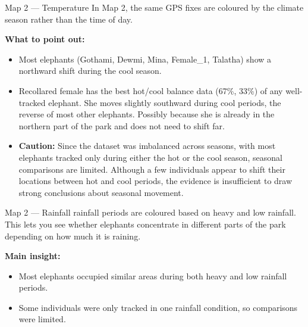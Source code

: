 \documentclass{beamer}
\begin{document}
	
	
	
	
	\begin{frame}{Map 2 --- Temperature}
		In Map 2, the same GPS fixes are coloured by the climate season rather than
		the time of day.
		
		\vspace{4pt}
		\textbf{What to point out:}
		\begin{itemize}
			\item Most elephants (Gothami, Dewmi, Mina, Female\_1, Talatha) show a northward shift during the cool season.
			\item Recollared female has the best hot/cool balance data (67\%, 33\%) of any
			well-tracked elephant.
			She moves slightly southward during cool periods, the reverse of most other elephants. Possibly because
			she is already in the northern part of the park and does not need to shift far.
			\item \textbf{Caution:} Since the dataset was imbalanced across seasons, with most elephants tracked only during either the hot or the cool season, seasonal comparisons are limited. Although a few individuals appear to shift their locations between hot and cool periods, the evidence is insufficient to draw strong conclusions about seasonal movement.
			
		\end{itemize}
		\vspace{6pt}
		
	\end{frame}
	
	
	
	
	
	\begin{frame}{Map 2 --- Rainfall}
		rainfall periods are coloured based on
		heavy and low rainfall.
		This lets you see whether elephants concentrate in different parts of the
		park depending on how much it is raining.
		
		\vspace{4pt}
		
		\vspace{6pt}
		\textbf{Main insight:}
		\begin{itemize}
			\item Most elephants occupied similar areas during both heavy and low
			rainfall periods.
			\item Some individuals were only tracked in one rainfall condition, so
			comparisons were limited.
		\end{itemize}
	\end{frame}
	
\end{document}
